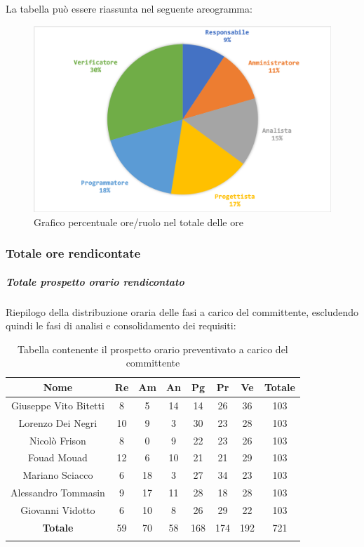 			La tabella può essere riassunta nel seguente areogramma:
			\begin{figure}[H]
				\centering
				\includegraphics[width=0.8\linewidth]{./images/preventivo/totOre2.png}
				\caption{Grafico percentuale ore/ruolo nel totale delle ore}
				\label{fig:grafico costi ruolo fase totale ore}
			\end{figure}
		
			\subsubsection{Totale ore rendicontate}
				\subparagraph{Totale prospetto orario rendicontato}
				Riepilogo della distribuzione oraria delle fasi a carico del committente, escludendo quindi le fasi di analisi e consolidamento dei requisiti:
				
				\begin{longtable}{|c|c|c|c|c|c|c|c|}
					\hline
					\rowcolor{lighter-grayer}
					\textbf{Nome} & \textbf{Re} & \textbf{Am} & \textbf{An} & \textbf{Pg}  & \textbf{Pr}   & \textbf{Ve} & \textbf{Totale} \\
					\hline
					\endfirsthead
					
					\hline
					Giuseppe Vito Bitetti 		& 8 & 5 & 14 & 14 & 26 & 36 & 103\\
					\hline
					\hline
					Lorenzo Dei Negri			& 10 & 9 & 3 & 30 & 23 & 28 & 103\\
					\hline
					\hline
					Nicolò Frison				    & 8 & 0 & 9 & 22 & 23 & 26 & 103\\
					\hline
					\hline
					Fouad Mouad 				 & 12 & 6 & 10 & 21 & 21 & 29 & 103\\
					\hline
					\hline
					Mariano Sciacco 			& 6 & 18 & 3 & 27 & 34 & 23 & 103\\
					\hline
					\hline
					Alessandro Tommasin    & 9 & 17 & 11 & 28 & 18 & 28 & 103\\
					\hline
					\hline
					Giovanni Vidotto 			 & 6 & 10 & 8 & 26 & 29 & 22 & 103\\
					\hline 
					\textbf{Totale}				 & 59 &  70 & 58 & 168 & 174 & 192 & 721\\
					\hline
					\caption{Tabella contenente il prospetto orario preventivato a carico del committente}
				\end{longtable}
				\pagebreak
				
